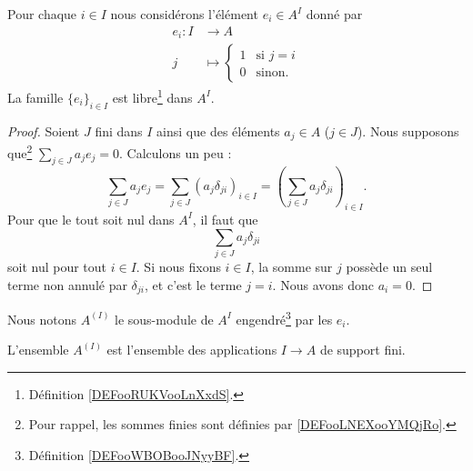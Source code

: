 \begin{lemma}
	Pour chaque \( i\in I\) nous considérons l'élément \( e_i\in A^I\) donné par
	\begin{equation}
		\begin{aligned}
			e_i\colon I & \to A                      \\
			j           & \mapsto \begin{cases}
				                      1 & \text{si } j=i \\
				                      0 & \text{sinon. }
			                      \end{cases}
		\end{aligned}
	\end{equation}
	La famille \( \{ e_i \}_{i\in I}\) est libre\footnote{Définition \ref{DEFooRUKVooLnXxdS}.} dans \( A^I\).
\end{lemma}

\begin{proof}
	Soient \( J\) fini dans \( I\) ainsi que des éléments \( a_j\in A\) (\( j\in J\)). Nous supposons que\footnote{Pour rappel, les sommes finies sont définies par \ref{DEFooLNEXooYMQjRo}.} \( \sum_{j\in J}a_je_j=0\). Calculons un peu :
	\begin{equation}
		\sum_{j\in J}a_je_j=\sum_{j\in J}(a_j\delta_{ji})_{i\in I}=\left( \sum_{j\in J}a_j\delta_{ji} \right)_{i\in I}.
	\end{equation}
	Pour que le tout soit nul dans \( A^I\), il faut que
	\begin{equation}
		\sum_{j\in J}a_j\delta_{ji}
	\end{equation}
	soit nul pour tout \( i\in I\). Si nous fixons \( i\in I\), la somme sur \( j\) possède un seul terme non annulé par \( \delta_{ji}\), et c'est le terme \( j=i\). Nous avons donc \( a_i=0\).
\end{proof}

\begin{definition}      \label{DEFooBMEPooFsCHgb}
	Nous notons \( A^{(I)}\) le sous-module de \( A^I\) engendré\footnote{Définition \ref{DEFooWBOBooJNyyBF}.} par les \( e_i\).
\end{definition}

\begin{lemma}
	L'ensemble \( A^{(I)}\) est l'ensemble des applications \( I\to A\) de support fini.
\end{lemma}

